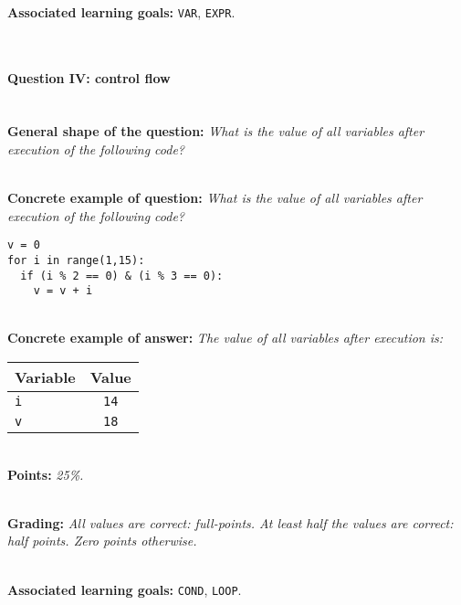 \ \\ 

\textbf{Associated learning goals:} \texttt{VAR}, \texttt{EXPR}.

\ \\ 

\paragraph{Question IV: control flow}

\ \\ 

\textbf{General shape of the question:} \textit{What is the value of all variables after execution of the following code?}

\ \\ 

\textbf{Concrete example of question:} \textit{What is the value of all variables after execution of the following code?}

\begin{lstlisting}
v = 0
for i in range(1,15):
  if (i % 2 == 0) & (i % 3 == 0):
    v = v + i
\end{lstlisting}

\ \\ 

\textbf{Concrete example of answer:} \textit{The value of all variables after execution is:}

\begin{tabular}{| l | c |}
\hline
\textbf{Variable} & \textbf{Value} \\
\hline
\texttt{i} & \texttt{14} \\
\hline
\texttt{v} & \texttt{18} \\
\hline
\end{tabular}

\ \\ 

\textbf{Points:} \textit{25\%.}

\ \\ 

\textbf{Grading:} \textit{All values are correct: full-points. At least half the values are correct: half points. Zero points otherwise.}

\ \\ 

\textbf{Associated learning goals:} \texttt{COND}, \texttt{LOOP}.

\ \\ 
